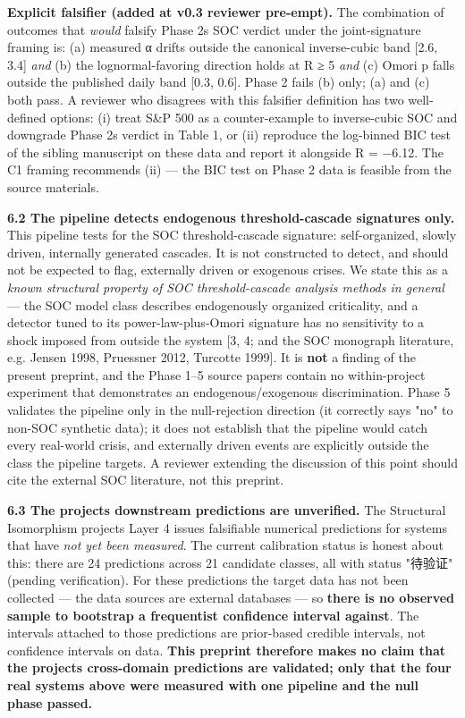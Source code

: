 \documentclass[
  11pt]{article}
\begin{document}
\textbf{Explicit falsifier (added at v0.3 reviewer pre-empt).} The
combination of outcomes that \emph{would} falsify Phase
2\textquotesingle s SOC verdict under the joint-signature framing is:
(a) measured α drifts outside the canonical inverse-cubic band {[}2.6,
3.4{]} \emph{and} (b) the lognormal-favoring direction holds at
\textbar R\textbar{} ≥ 5 \emph{and} (c) Omori p falls outside the
published daily band {[}0.3, 0.6{]}. Phase 2 fails (b) only; (a) and (c)
both pass. A reviewer who disagrees with this falsifier definition has
two well-defined options: (i) treat S\&P 500 as a counter-example to
inverse-cubic SOC and downgrade Phase 2\textquotesingle s verdict in
Table 1, or (ii) reproduce the log-binned BIC test of the sibling
manuscript on these data and report it alongside R = −6.12. The C1
framing recommends (ii) --- the BIC test on Phase 2 data is feasible
from the source materials.

\textbf{6.2 The pipeline detects endogenous threshold-cascade signatures
only.} This pipeline tests for the SOC threshold-cascade signature:
self-organized, slowly driven, internally generated cascades. It is not
constructed to detect, and should not be expected to flag, externally
driven or exogenous crises. We state this as a \emph{known structural
property of SOC threshold-cascade analysis methods in general} --- the
SOC model class describes endogenously organized criticality, and a
detector tuned to its power-law-plus-Omori signature has no sensitivity
to a shock imposed from outside the system {[}3, 4; and the SOC
monograph literature, e.g. Jensen 1998, Pruessner 2012, Turcotte
1999{]}. It is \textbf{not} a finding of the present preprint, and the
Phase 1--5 source papers contain no within-project experiment that
demonstrates an endogenous/exogenous discrimination. Phase 5 validates
the pipeline only in the null-rejection direction (it correctly says
"no" to non-SOC synthetic data); it does not establish that the pipeline
would catch every real-world crisis, and externally driven events are
explicitly outside the class the pipeline targets. A reviewer extending
the discussion of this point should cite the external SOC literature,
not this preprint.

\textbf{6.3 The project\textquotesingle s downstream predictions are
unverified.} The Structural Isomorphism project\textquotesingle s Layer
4 issues falsifiable numerical predictions for systems that have
\emph{not yet been measured}. The current calibration status is honest
about this: there are 24 predictions across 21 candidate classes, all
with status "待验证" (pending verification). For these predictions the
target data has not been collected --- the data sources are external
databases --- so \textbf{there is no observed sample to bootstrap a
frequentist confidence interval against}. The intervals attached to
those predictions are prior-based credible intervals, not confidence
intervals on data. \textbf{This preprint therefore makes no claim that
the project\textquotesingle s cross-domain predictions are validated;
only that the four real systems above were measured with one pipeline
and the null phase passed.}
\end{document}
